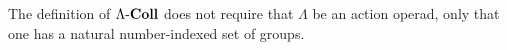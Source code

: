 
\begin{rem}
The definition of $\Lambda\mathbf{\mbox{-}Coll}$ does not require that $\Lambda$ be an action operad, only that one has a natural number-indexed set of groups. 
\end{rem}

